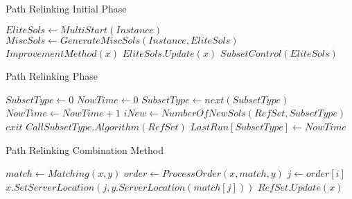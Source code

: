\hline \vspace{3pt}
\caption{Path Relinking Initial Phase}\label{pr_init}
\vspace{3pt} \hline
\begin{algorithmic}[0]
  \State $EliteSols \gets MultiStart(Instance)$
  \Repeat
  \State $MiscSols \gets GenerateMiscSols(Instance,EliteSols)$
  \State $ImprovementMethod(x)$
  \State $EliteSols.Update(x)$
  \EndFor
  \State $SubsetControl(EliteSols)$
  \EndProcedure
  \hline
\end{algorithmic}

\newpage
\hline \vspace{3pt}
\caption{Path Relinking Phase}\label{pr_pahse}
\vspace{3pt} \hline
\begin{algorithmic}[0]
  \State $SubsetType \gets 0$
  \State $NowTime \gets 0$
  \State $SubsetType \gets next(SubsetType)$
  \State $NowTime \gets NowTime + 1$
  \State $iNew \gets NumberOfNewSols(RefSet,SubsetType)$
  \State $exit$
  \EndIf
  \State $Call SubsetType.Algorithm(RefSet)$
  \State $LastRun[SubsetType] \gets NowTime$
  \EndWhile
  \EndProcedure
  \hline
\end{algorithmic}

\newpage
\hline \vspace{3pt}
\caption{Path Relinking Combination Method}\label{pr_combination}
\vspace{3pt} \hline
\begin{algorithmic}[0]
  \State $match \gets Matching(x,y)$
  \State $order \gets ProcessOrder(x,match,y)$
  \State $j \gets order[i]$
  \State $x.SetServerLocation(j,y.ServerLocation(match[j]))$
  \State $RefSet.Update(x)$
  \EndIf \EndFor \EndFor
  \EndProcedure
  \hline
\end{algorithmic}
